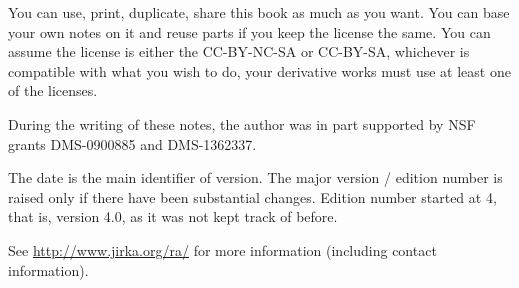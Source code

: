 \documentclass[12pt]{book}
\theoremstyle{plain}
\theoremstyle{remark}
\theoremstyle{definition}
\theoremstyle{exercise}
\theoremstyle{example}
\begin{document}
\bigskip

\noindent
You can use, print, duplicate, share this book as much as you want.  You can
base your own notes on it and reuse parts if you keep the license the
same.  You can assume the license is either the CC-BY-NC-SA or CC-BY-SA,
whichever is compatible with what you wish to do, your derivative works must
use at least one of the licenses.

\bigskip

\noindent
During the writing of these notes, 
the author was in part supported by NSF grants DMS-0900885 and
DMS-1362337.

\bigskip

\noindent
The date is the main identifier of version.  The major version / edition
number is raised only if there have been substantial changes.  Edition
number started at 4, that is, version 4.0, as it was not kept track of
before.  %

\bigskip

\noindent
See \url{http://www.jirka.org/ra/} for more information
(including contact information).



\tableofcontents
{}

\newpage
















\end{document}
